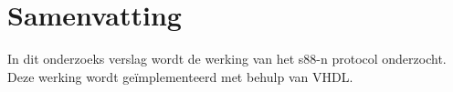 	\chapter*{Samenvatting}
	In dit onderzoeks verslag wordt de werking van het s88-n protocol onderzocht.
	Deze werking wordt geïmplementeerd met behulp van VHDL.
	